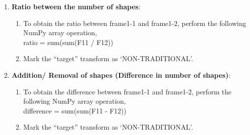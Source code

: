 \documentclass[10pt, letter]{article}
\begin{document}
\begin{enumerate}
\textbf{Note}: If none of the ``traditional'' transforms have been reported, then it is necessary to find a good-enough match using \textbf{BOTH} the ``non-traditional'' transforms, one after another. In the case of a non-traditional transform, a particular metric (ratio between the number of shapes in frame1-1 and frame1-2 or the difference in the number of shapes between them) is obtained from the reference frame and it is matched against every possible ordered pair of 
		\\\hspace*{3cm}(frame2-1, frame$_i$), \\
where i is from 1 to $NumberOfAnswerChoices$. In such a case the answer choice ($i$) which gives the closest match (subject to the thresholds defined in Points 2 and 3 of Assumption 5 depending on the metric in question) is declared the right choice.

\item \textbf{Ratio between the number of shapes}:
\begin{enumerate}
	\item To obtain the ratio between frame1-1 and frame1-2, perform the following NumPy array operation,\\
		\hspace*{3cm} ratio = sum(sum(F11 / F12))
	\item Mark the ``target'' transform as `NON-TRADITIONAL'.
\end{enumerate}

\item \textbf{Addition/ Removal of shapes (Difference in number of shapes)}:
\begin{enumerate}
	\item To obtain the difference between frame1-1 and frame1-2, perform the following NumPy array operation,\\
		\hspace*{3cm} difference = sum(sum(F11 - F12))
	\item Mark the ``target'' transform as `NON-TRADITIONAL'.
\end{enumerate}
\end{enumerate}
\end{document}
